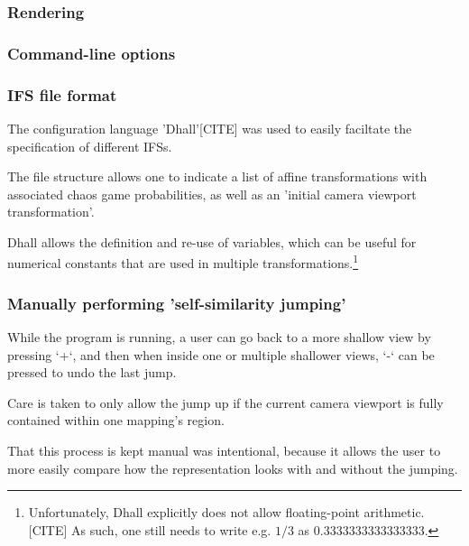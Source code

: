 \documentclass[11pt]{article}
\begin{document}

\subsubsection{Rendering}
\label{sec:org32ebe1f}

\subsubsection{Command-line options}
\label{sec:orgff98e72}

\subsubsection{IFS file format}
\label{sec:orgd545f4d}

The configuration language 'Dhall'[CITE] was used to 
easily faciltate the specification of different IFSs.

The file structure allows one to indicate a list of affine transformations with associated chaos game probabilities,
as well as an 'initial camera viewport transformation'.

Dhall allows the definition and re-use of variables, which can be useful
for numerical constants that are used in multiple transformations.\footnote{Unfortunately, Dhall explicitly does not allow floating-point arithmetic.[CITE]
As such, one still needs to write e.g. \(1/3\) as \(0.3333333333333333\).}


\subsubsection{Manually performing 'self-similarity jumping'}
\label{sec:org2ebdd16}

While the program is running, a user can go back to a more shallow view by pressing `+`, and then when inside one or multiple shallower views,
`-` can be pressed to undo the last jump.

Care is taken to only allow the jump up if the current camera viewport is fully contained within one mapping's region.

That this process is kept manual was intentional, because it allows the user to more easily compare how
the representation looks with and without the jumping.
\end{document}
